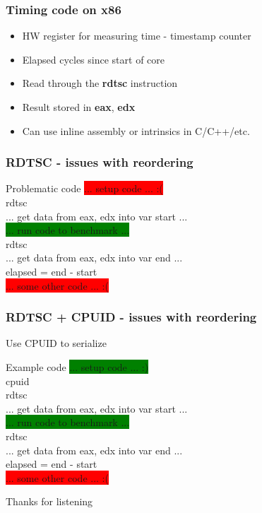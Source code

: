 \documentclass{beamer}
\begin{document}
\begin{frame}
\frametitle{Timing code on x86}
\begin{itemize}
\item HW register for measuring time - timestamp counter
\item Elapsed cycles since start of core
\item Read through the \textbf{rdtsc} instruction
\item Result stored in \textbf{eax}, \textbf{edx}
\item Can use inline assembly or intrinsics in C/C++/etc.
\end{itemize}
\end{frame}

\begin{frame}[fragile]
\frametitle{RDTSC - issues with reordering}
\begin{block}{Problematic code}
\colorbox{red}{... setup code ... :(} \\
rdtsc\\
... get data from eax, edx into var start ...\\
\colorbox{green}{... run code to benchmark ...}\\
rdtsc\\
... get data from eax, edx into var end ...\\
elapsed = end - start\\
\colorbox{red}{... some other code ... :(}\\
\end{block}
\end{frame}

\begin{frame}[fragile]
\frametitle{RDTSC + CPUID - issues with reordering}
Use CPUID to serialize
\begin{block}{Example code}
\colorbox{green}{... setup code ... :)} \\
cpuid\\
rdtsc\\
... get data from eax, edx into var start ...\\
\colorbox{green}{... run code to benchmark ...}\\
rdtsc\\
... get data from eax, edx into var end ...\\
elapsed = end - start\\
\colorbox{red}{... some other code ... :(}\\
\end{block}
\end{frame}



\begin{frame}
\Huge{\centerline{Thanks for listening}}
\end{frame}

\end{document}
